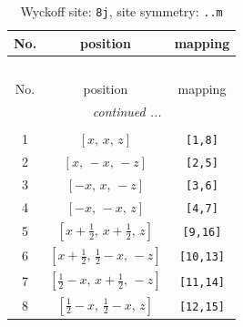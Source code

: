 \documentclass[fleqn,8pt]{jsarticle}
\begin{document}
\begin{longtable}{ccc}
\caption{Wyckoff site: {\tt 8j}, site symmetry: {\tt ..m}}
 \\
 \hline \hline
No. & position & mapping \\ \hline \endfirsthead

\multicolumn{2}{l}{\tablename\ \thetable{}} \\
 \hline \hline
No. & position & mapping \\ \hline \endhead

 \hline \hline
\multicolumn{2}{r}{\footnotesize\it continued ...} \\ \endfoot

 \hline \hline
\multicolumn{2}{r}{} \\ \endlastfoot

1 & $\left[ x,\, x,\, z \right]$ & {\tt [1,8]} \\ \hline
2 & $\left[ x,\, - x,\, - z \right]$ & {\tt [2,5]} \\ \hline
3 & $\left[ - x,\, x,\, - z \right]$ & {\tt [3,6]} \\ \hline
4 & $\left[ - x,\, - x,\, z \right]$ & {\tt [4,7]} \\ \hline
5 & $\left[ x + \frac{1}{2},\, x + \frac{1}{2},\, z \right]$ & {\tt [9,16]} \\ \hline
6 & $\left[ x + \frac{1}{2},\, \frac{1}{2} - x,\, - z \right]$ & {\tt [10,13]} \\ \hline
7 & $\left[ \frac{1}{2} - x,\, x + \frac{1}{2},\, - z \right]$ & {\tt [11,14]} \\ \hline
8 & $\left[ \frac{1}{2} - x,\, \frac{1}{2} - x,\, z \right]$ & {\tt [12,15]} \\
\end{longtable}
\renewcommand{\arraystretch}{1.2}
\end{document}
